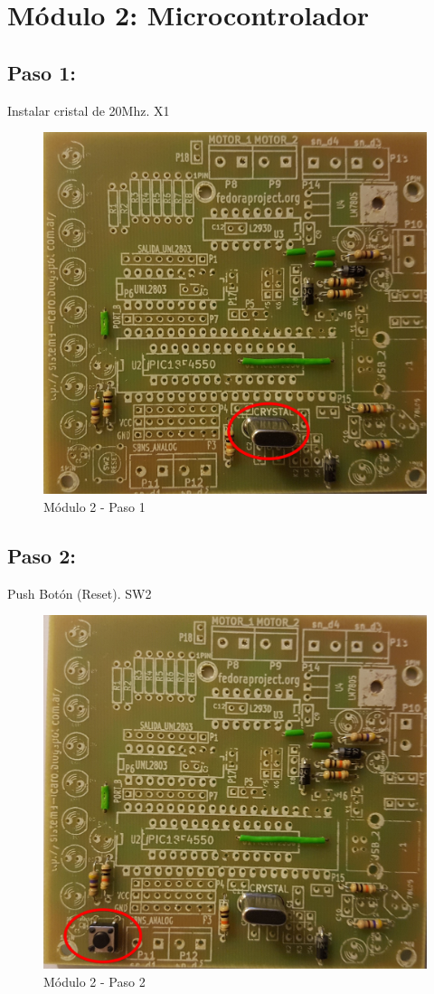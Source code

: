 \chapter{Módulo 2: Microcontrolador}

\section{Paso 1:}

Instalar cristal de 20Mhz. X1

\begin{figure}[h]
	\centering
	\includegraphics[width=0.8\linewidth]{Modulo_2/M2_1}
	\caption{Módulo 2 - Paso 1}
	\label{fig:M2_1}
\end{figure}

\newpage

\section{Paso 2:}

Push Botón (Reset). SW2

\begin{figure}[h]
	\centering
	\includegraphics[width=0.8\linewidth]{Modulo_2/M2_2}
	\caption{Módulo 2 - Paso 2}
	\label{fig:M2_2}
\end{figure}

